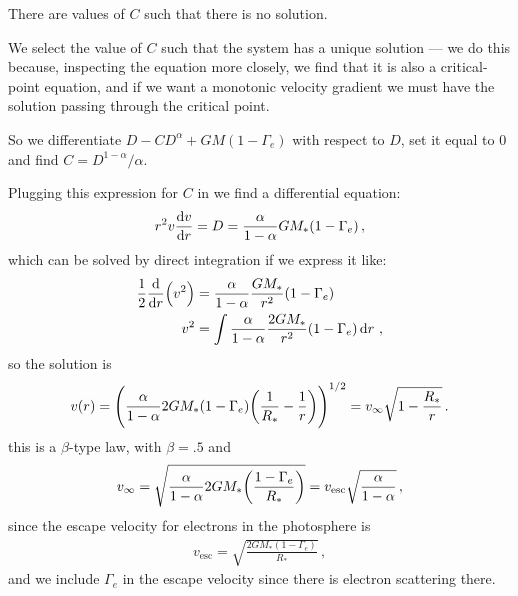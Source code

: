 \documentclass[main.tex]{subfiles}
\begin{document}
There are values of \(C\) such that there is no solution. 

We select the value of \(C\) such that the system has a unique solution --- we do this because, inspecting the equation more closely, we find that it is also a critical-point equation, and if we want a monotonic velocity gradient we must have the solution passing through the critical point.


So we differentiate \(D - C D^{\alpha } + GM (1-\Gamma_{e})\) with respect to \(D\), set it equal to \(0\) and find \(C = D^{1-\alpha } / \alpha \).

Plugging this expression for \(C\) in we find a differential equation: 
%
\begin{align}
  r^2 v \dv{v}{r} = D = \frac{\alpha }{1 - \alpha } GM_{*} (1-\Gamma_{e})
\,,
\end{align}
%
which can be solved by direct integration if we express it like: 
%
\begin{subequations}
\begin{align}
\frac{1}{2} \dv{}{r} \qty(v^2)
&= \frac{\alpha }{1-\alpha } \frac{GM_{*}}{r^2} (1 - \Gamma_{e}) \\
v^2 &= \int  \frac{\alpha }{1-\alpha } \frac{2GM_{*}}{r^2} (1 - \Gamma_{e}) \dd{r} 
\,,
\end{align}
\end{subequations}
%
so the solution is 
%
\begin{align}
  v(r) = \qty(\frac{\alpha }{1-\alpha } 2GM_{*} \qty(1-\Gamma_{e} ) \qty(\frac{1}{R_{*}} - \frac{1}{r}))^{1/2}
  = v_{ \infty } \sqrt{1 - \frac{R_{*}}{r}}
\,. 
\end{align}
%
this is a \(\beta \)-type law, with \(\beta = \num{.5}\) and 
%
\begin{align}
  v_{ \infty } = \sqrt{\frac{\alpha }{1-\alpha } 2GM_{*} \qty(\frac{1-\Gamma_{e} }{R_{*}})}
  = v _{\text{esc}} \sqrt{\frac{\alpha }{1 - \alpha }}
\,,
\end{align}
%
since the escape velocity for electrons in the photosphere is 
%
\begin{align}
  v _{\text{esc}} = \sqrt{\frac{2 G M_{*} (1 - \Gamma_{e })}{R_{*}}}
\,,
\end{align}
%
and we include \(\Gamma_{e} \) in the escape velocity since there is electron scattering there.
\end{document}
